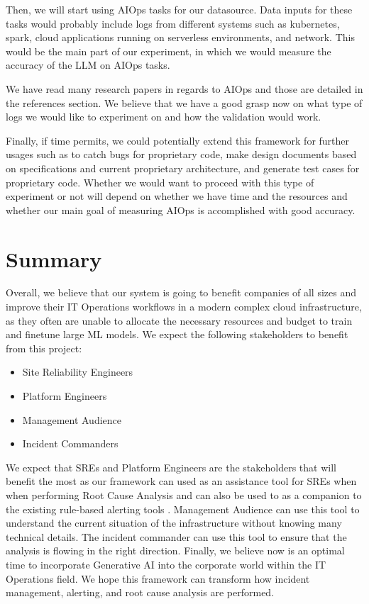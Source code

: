 \documentclass[conference]{IEEEtran}
\begin{document}
Then, we will start using AIOps tasks for our datasource. Data inputs for these tasks would probably include logs from different systems such as kubernetes, spark, cloud applications running on serverless environments, and network. This would be the main part of our experiment, in which we would measure the accuracy of the LLM on AIOps tasks.

We have read many research papers in regards to AIOps and those are detailed in the references section. We believe that we have a good grasp now on what type of logs we would like to experiment on and how the validation would work. 

Finally, if time permits, we could potentially extend this framework for further usages such as  to catch bugs for proprietary code, make design documents based on specifications and current proprietary architecture, and generate test cases for proprietary code. Whether we would want to proceed with this type of experiment or not will depend on whether we have time and the resources and whether our main goal of measuring AIOps is accomplished with good accuracy. 

\section{Summary}

Overall, we believe that our system is going to benefit companies of all sizes and improve their IT Operations workflows in a modern complex cloud infrastructure, as they often are unable to allocate the necessary resources and budget to train and finetune large ML models. We expect the following stakeholders to benefit from this project:
\begin{itemize}
    \item Site Reliability Engineers
    \item Platform Engineers 
    \item Management Audience 
    \item Incident Commanders 
\end{itemize}

We expect that SREs and Platform Engineers are the stakeholders that will benefit the most as our framework can used as an assistance tool for SREs when when performing Root Cause Analysis and can also be used to as a companion to the existing rule-based alerting tools \cite{model-checking-guided-testing}. Management Audience can use this tool to understand the current situation of the infrastructure without knowing many technical details. The incident commander can use this tool to ensure that the analysis is flowing in the right direction. Finally, we believe now is an optimal time to incorporate Generative AI into the corporate world within the IT Operations field. We hope this framework can transform how incident management, alerting, and root cause analysis are performed. 




\vspace{12pt}
\end{document}
